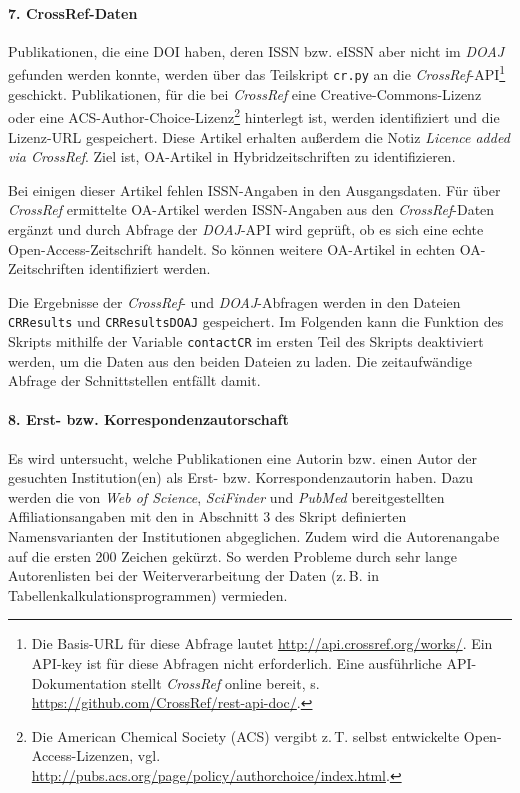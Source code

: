 \paragraph{7. CrossRef-Daten}
Publikationen, die eine DOI haben, deren ISSN bzw. eISSN aber nicht im \textit{DOAJ} gefunden werden konnte, werden über das Teilskript \texttt{cr.py} an die \textit{CrossRef}-API\footnote{Die Basis-URL für diese Abfrage lautet \url{http://api.crossref.org/works/}. Ein API-key ist für diese Abfragen nicht erforderlich. Eine ausführliche API-Dokumentation stellt \textit{CrossRef} online bereit, s. \url{https://github.com/CrossRef/rest-api-doc/}.} geschickt. Publikationen, für die bei \textit{CrossRef} eine Creative-Commons-Lizenz oder eine ACS-Author-Choice-Lizenz\footnote{Die American Chemical Society (ACS) vergibt z.\,T. selbst entwickelte Open-Access-Lizenzen, vgl. \url{http://pubs.acs.org/page/policy/authorchoice/index.html}.} hinterlegt ist, werden identifiziert und die Lizenz-URL gespeichert. Diese Artikel erhalten außerdem die Notiz \textit{Licence added via CrossRef}. Ziel ist, OA-Artikel in Hybridzeitschriften zu identifizieren.

Bei einigen dieser Artikel fehlen ISSN-Angaben in den Ausgangsdaten. Für über \textit{CrossRef} ermittelte OA-Artikel werden ISSN-Angaben aus den \textit{CrossRef}-Daten ergänzt und durch Abfrage der \textit{DOAJ}-API wird geprüft, ob es sich eine echte Open-Access-Zeitschrift handelt. So können weitere OA-Artikel in echten OA-Zeitschriften identifiziert werden.

Die Ergebnisse der \textit{CrossRef}- und \textit{DOAJ}-Abfragen werden in den Dateien \texttt{CRResults} und \texttt{CRResultsDOAJ} gespeichert. Im Folgenden kann die Funktion des Skripts mithilfe der Variable \texttt{contactCR} im ersten Teil des Skripts deaktiviert werden, um die Daten aus den beiden Dateien zu laden. Die zeitaufwändige Abfrage der Schnittstellen entfällt damit.

\paragraph{8. Erst- bzw. Korrespondenzautorschaft} \label{func-corr-author}
Es wird untersucht, welche Publikationen eine Autorin bzw. einen Autor der gesuchten Institution(en) als Erst- bzw. Korrespondenzautorin haben. Dazu werden die von \textit{Web of Science}, \textit{SciFinder} und \textit{PubMed} bereitgestellten Affiliationsangaben mit den in Abschnitt 3 des Skript definierten Namensvarianten der Institutionen abgeglichen. Zudem wird die Autorenangabe auf die ersten 200 Zeichen gekürzt. So werden Probleme durch sehr lange Autorenlisten bei der Weiterverarbeitung der Daten (z.\,B. in Tabellenkalkulationsprogrammen) vermieden.

